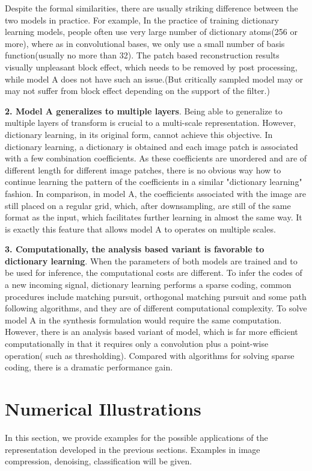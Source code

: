 \documentclass[a4paper]{article}
\begin{document}
Despite the formal similarities, there are usually striking difference between the two models in practice. For example, In the practice of training dictionary learning models, people often use very large number of dictionary atoms(256 or more), where as in convolutional bases, we only use a small number of basis function(usually no more than 32). The patch based reconstruction results visually unpleasant block effect, which needs to be removed by post processing, while model A does not have such an issue.(But critically sampled model may or may not suffer from block effect depending on the support of the filter.)

\textbf{2. Model A generalizes to multiple layers}. Being able to generalize to multiple layers of transform is crucial to a multi-scale representation. However, dictionary learning, in its original form, cannot achieve this objective. In dictionary learning, a dictionary is obtained and each image patch is associated with a few combination coefficients. As these coefficients are unordered and are of different length for different image patches, there is no obvious way how to continue learning the pattern of the coefficients in a similar "dictionary learning" fashion. In comparison, in model A, the coefficients associated with the image are still placed on a regular grid, which, after downsampling, are still of the same format as the input, which facilitates further learning in almost the same way. It is exactly this feature that allows model A to operates on multiple scales. 

\textbf{3. Computationally, the analysis based variant is favorable to dictionary learning}. When the parameters of both models are trained and to be used for inference, the computational costs are different. To infer the codes of a new incoming signal, dictionary learning performs a sparse coding, common procedures include matching pursuit, orthogonal matching pursuit and some path following algorithms, and they are of  different computational complexity. To solve model A in the synthesis formulation would require the same computation. However, there is an analysis based variant of model, which is far more efficient computationally in that it requires only a convolution plus a point-wise operation( such as thresholding). Compared with algorithms for solving sparse coding, there is a dramatic performance gain.




\section{Numerical Illustrations}
In this section, we provide examples for the possible applications of the representation developed in the previous sections. Examples in image compression, denoising, classification will be given. 
\end{document}
